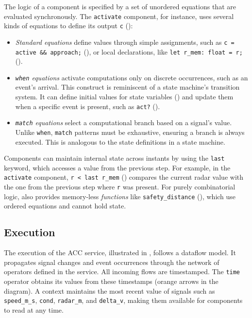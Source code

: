 The logic of a component is specified by a set of unordered equations that are
evaluated synchronously. The \texttt{activate} component, for instance, uses several
kinds of equations to define its output \texttt{c}
():
\begin{itemize}
  \item \emph{Standard equations} define values through simple assignments, such as
        \texttt{c = active \&\& approach;} (),
        or local declarations, like \texttt{let r\_mem: float = r;}
        ().
  \item \emph{\texttt{when} equations} activate computations only on discrete
        occurrences, such as an event's arrival. This construct is reminiscent of a
        state machine's transition system. It can define initial values for state
        variables () and update them when a
        specific event is present, such as \texttt{act?}
        ().
  \item \emph{\texttt{match} equations} select a computational branch based on a
        signal's value. Unlike \texttt{when}, \texttt{match} patterns must be
        exhaustive, ensuring a branch is always executed. This is analogous to the
        state definitions in a state machine.
\end{itemize}

Components can maintain internal state across instants by using the \texttt{last}
keyword, which accesses a value from the previous step. For example, in the
\texttt{activate} component, \texttt{r < last r\_mem}
() compares the current radar value with the
one from the previous step where \texttt{r} was present. For purely combinatorial
logic, \GRust also provides memory-less \emph{functions} like
\texttt{safety\_distance}
(),
which use ordered equations and cannot hold state.

\subsection{Execution}

The execution of the ACC service, illustrated in , follows a
dataflow model. It propagates signal changes and event occurrences through the network
of operators defined in the service. All incoming flows are timestamped. The
\texttt{time} operator obtains its values from these timestamps (orange arrows in the
diagram). A context maintains the most recent value of signals such as
\texttt{speed\_m\_s}, \texttt{cond}, \texttt{radar\_m}, and \texttt{delta\_v}, making
them available for components to read at any time.

